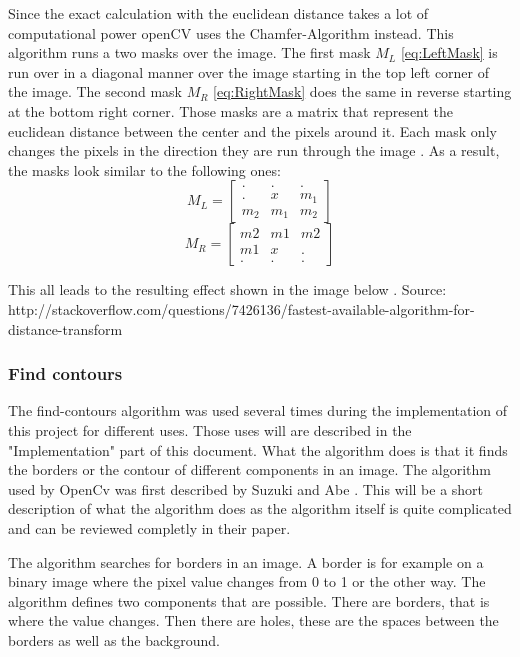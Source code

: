 Since the exact calculation with the euclidean distance takes a lot of computational power openCV uses the Chamfer-Algorithm instead. This algorithm runs a two masks over the image. The first mask $M_{L}$ \eqref{eq:LeftMask} is run over in a diagonal manner over the image starting in the top left corner of the image. The second mask $M_{R}$ \eqref{eq:RightMask} does the same in reverse starting at the bottom right corner. Those masks are a matrix that represent the euclidean distance between the center and the pixels around it. Each mask only changes the pixels in the direction they are run through the image \citep{burger_burge_2016}. As a result, the masks look similar to the following ones:
\begin{equation}\label{eq:LeftMask} M_{L} = \begin{bmatrix} . & . & .\\ . & x & m_1 \\ m_2 & m_1 & m_2 \end{bmatrix}\end{equation}
\begin{equation}\label{eq:RightMask}M_{R} = \begin{bmatrix} m2 & m1 & m2 \\ m1 & x & . \\ . & . & . \end{bmatrix} \end{equation}

This all leads to the resulting effect shown in the image below \citep[Section 3.3.3]{szeliski_2011}.
Source: http://stackoverflow.com/questions/7426136/fastest-available-algorithm-for-distance-transform

\subsubsection{Find contours}
\label{sub:FindContoursTheory}
The find-contours algorithm was used several times during the implementation of this project for different uses. Those uses will are described in the "Implementation" part of this document. What the algorithm does is that it finds the borders or the contour of different components in an image. The algorithm used by OpenCv was first described by Suzuki and Abe \cite{suzuki_abe_1985}. This will be a short description of what the algorithm does as the algorithm itself is quite complicated and can be reviewed completly in their paper.

The algorithm searches for borders in an image. A border is for example on a binary image where the pixel value changes from 0 to 1 or the other way. The algorithm defines two components that are possible. There are borders, that is where the value changes. Then there are holes, these are the spaces between the borders as well as the background.

